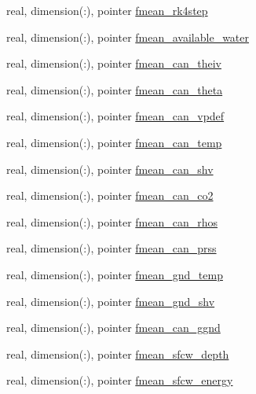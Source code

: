 \begin{DoxyCompactItemize}
\item 
real, dimension(\+:), pointer \hyperlink{structed__state__vars_1_1edtype_a21fb6171be7f225ab7347afa9b2e32a0}{fmean\+\_\+rk4step}
\item 
real, dimension(\+:), pointer \hyperlink{structed__state__vars_1_1edtype_aaf5a542b97bb3ddf00d69e3b094e2023}{fmean\+\_\+available\+\_\+water}
\item 
real, dimension(\+:), pointer \hyperlink{structed__state__vars_1_1edtype_a0226472d416fc96ab1fffc64b6e8d712}{fmean\+\_\+can\+\_\+theiv}
\item 
real, dimension(\+:), pointer \hyperlink{structed__state__vars_1_1edtype_a864fbb01ec2b0c1b7fa6ed46d5c64e6c}{fmean\+\_\+can\+\_\+theta}
\item 
real, dimension(\+:), pointer \hyperlink{structed__state__vars_1_1edtype_ac844392a6e1f40b66a4f356119982d2a}{fmean\+\_\+can\+\_\+vpdef}
\item 
real, dimension(\+:), pointer \hyperlink{structed__state__vars_1_1edtype_aba7d8689ca341a72c647afe75c8ee4a4}{fmean\+\_\+can\+\_\+temp}
\item 
real, dimension(\+:), pointer \hyperlink{structed__state__vars_1_1edtype_a5d82452962cc28a9161910591331ca7d}{fmean\+\_\+can\+\_\+shv}
\item 
real, dimension(\+:), pointer \hyperlink{structed__state__vars_1_1edtype_a57911cf81f91cc041549f0cb0016f5b5}{fmean\+\_\+can\+\_\+co2}
\item 
real, dimension(\+:), pointer \hyperlink{structed__state__vars_1_1edtype_a0cfa17703489fd8da362a3a2d75a326e}{fmean\+\_\+can\+\_\+rhos}
\item 
real, dimension(\+:), pointer \hyperlink{structed__state__vars_1_1edtype_a36595a0a5fc810f3890b74f457ef69cf}{fmean\+\_\+can\+\_\+prss}
\item 
real, dimension(\+:), pointer \hyperlink{structed__state__vars_1_1edtype_ab87d82abf507c2b1518efd95ca0af77b}{fmean\+\_\+gnd\+\_\+temp}
\item 
real, dimension(\+:), pointer \hyperlink{structed__state__vars_1_1edtype_a4e5fe7d6665df6c48ef32efe36792203}{fmean\+\_\+gnd\+\_\+shv}
\item 
real, dimension(\+:), pointer \hyperlink{structed__state__vars_1_1edtype_a04bf7623d42ae5874a89e7b7d7d9fca3}{fmean\+\_\+can\+\_\+ggnd}
\item 
real, dimension(\+:), pointer \hyperlink{structed__state__vars_1_1edtype_a043ea45e727ca61a5fd33f0b9d89d162}{fmean\+\_\+sfcw\+\_\+depth}
\item 
real, dimension(\+:), pointer \hyperlink{structed__state__vars_1_1edtype_a09de8d759f119d7dc638c8fbf96ca99d}{fmean\+\_\+sfcw\+\_\+energy}

\end{DoxyCompactItemize}
